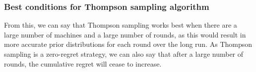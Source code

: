 \subsubsection{Best conditions for Thompson sampling algorithm}
From this, we can say that Thompson sampling works best when there are a large number of machines and a large number of rounds, as this would result in more accurate prior distributions for each round over the long run. As Thompson sampling is a zero-regret strategy, we can also say that after a large number of rounds, the cumulative regret will cease to increase. 

